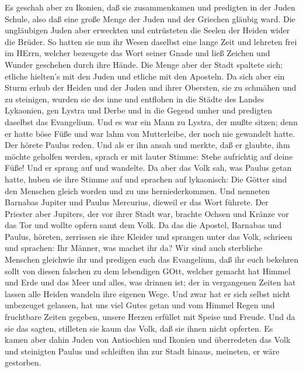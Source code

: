  Es geschah aber zu Ikonien, daß sie zusammenkamen und
predigten in der Juden Schule, also daß eine große Menge der Juden und
der Griechen gläubig ward.  Die ungläubigen Juden aber
erweckten und entrüsteten die Seelen der Heiden wider die Brüder.
 So hatten sie nun ihr Wesen daselbst eine lange Zeit und
lehreten frei im HErrn, welcher bezeugete das Wort seiner Gnade und ließ
Zeichen und Wunder geschehen durch ihre Hände.  Die Menge
aber der Stadt spaltete sich; etliche hielten's mit den Juden und
etliche mit den Aposteln.  Da sich aber ein Sturm erhub der
Heiden und der Juden und ihrer Obersten, sie zu schmähen und zu
steinigen,  wurden sie des inne und entflohen in die Städte
des Landes Lykaonien, gen Lystra und Derbe und in die Gegend umher
 und predigten daselbst das Evangelium.  Und es
war ein Mann zu Lystra, der mußte sitzen; denn er hatte böse Füße und
war lahm von Mutterleibe, der noch nie gewandelt hatte.  Der
hörete Paulus reden. Und als er ihn ansah und merkte, daß er glaubte,
ihm möchte geholfen werden,  sprach er mit lauter Stimme:
Stehe aufrichtig auf deine Füße! Und er sprang auf und wandelte.
 Da aber das Volk sah, was Paulus getan hatte, huben sie
ihre Stimme auf und sprachen auf lykaonisch: Die Götter sind den
Menschen gleich worden und zu uns herniederkommen.  Und
nenneten Barnabas Jupiter und Paulus Mercurius, dieweil er das Wort
führete.  Der Priester aber Jupiters, der vor ihrer Stadt
war, brachte Ochsen und Kränze vor das Tor und wollte opfern samt dem
Volk.  Da das die Apostel, Barnabas und Paulus, höreten,
zerrissen sie ihre Kleider und sprangen unter das Volk, schrieen
 und sprachen: Ihr Männer, was machet ihr da? Wir sind auch
sterbliche Menschen gleichwie ihr und predigen euch das Evangelium, daß
ihr euch bekehren sollt von diesen falschen zu dem lebendigen GOtt,
welcher gemacht hat Himmel und Erde und das Meer und alles, was drinnen
ist;  der in vergangenen Zeiten hat lassen alle Heiden
wandeln ihre eigenen Wege.  Und zwar hat er sich selbst
nicht unbezeuget gelassen, hat uns viel Gutes getan und vom Himmel Regen
und fruchtbare Zeiten gegeben, unsere Herzen erfüllet mit Speise und
Freude.  Und da sie das sagten, stilleten sie kaum das
Volk, daß sie ihnen nicht opferten.  Es kamen aber dahin
Juden von Antiochien und Ikonien und überredeten das Volk und steinigten
Paulus und schleiften ihn zur Stadt hinaus, meineten, er wäre gestorben.
